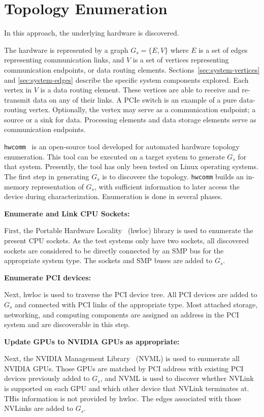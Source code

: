\section{Topology Enumeration}
\label{sec:hardware-enumeration}

In this approach, the underlying hardware is discovered.

The hardware is represented by a graph $G_s = \{E,V\}$ where $E$ is a set of edges representing communication links, and $V$ is a set of vertices representing communication endpoints, or data routing elements.
Sections~\ref{sec:system-vertices} and \ref{sec:system-edges} describe the specific system components explored.
Each vertex in $V$ is a data routing element.
These vertices are able to receive and re-transmit data on any of their links.
A PCIe switch is an example of a pure data-routing vertex.
Optionally, the vertex may serve as a communication endpoint; a source or a sink for data.
Processing elements and data storage elements serve as communication endpoints.

\texttt{hwcomm}~\cite{pearson2018hwcomm} is an open-source tool developed for automated hardware topology enumeration.
This tool can be executed on a target system to generate $G_s$ for that system.
Presently, the tool has only been tested on Linux operating systems.
The first step in generating $G_s$ is to discovere the topology.
\texttt{hwcomm} builds an in-memory representation of $G_s$, with sufficient information to later access the device during characterization.
Enumeration is done in several phases.

\textbf{Enumerate and Link CPU Sockets:}

First, the Portable Hardware Locality~\cite{broquedis2010hwloc} (hwloc) library is used to enumerate the present CPU sockets.
As the test systems only have two sockets, all discovered sockets are considered to be directly connected by an SMP bus for the appropriate system type.
The sockets and SMP buses are added to $G_s$.

\textbf{Enumerate PCI devices:}

Next, hwloc is used to traverse the PCI device tree.
All PCI devices are added to $G_s$ and connected with PCI links of the appropriate type.
Most attached storage, networking, and computing components are assigned an address in the PCI system and are discoverable in this step.

\textbf{Update GPUs to NVIDIA GPUs as appropriate:}

Next, the NVIDIA Management Library~\cite{nvidia2017nvml} (NVML) is used to enumerate all NVIDIA GPUs.
Those GPUs are matched by PCI address with existing PCI devices previously added to $G_s$, and NVML is used to discover whether NVLink is supported on each GPU and which other device that NVLink terminates at.
THis information is not provided by hwloc.
The edges associated with those NVLinks are added to $G_s$.


